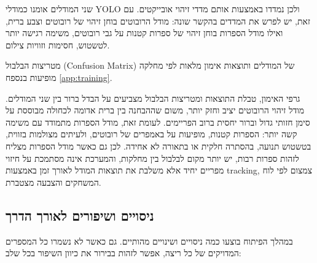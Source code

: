 שני המודלים אומנו כמודלי \textenglish{YOLO} ולכן נמדדו באמצעות אותם
מדדי זיהוי אובייקטים. עם זאת, יש לפרש את המדדים בהקשר שונה: מודל
הרובוטים בוחן זיהוי של רובוטים וצבע ברית, ואילו מודל הספרות בוחן זיהוי
של ספרות קטנות על גבי רובוטים, משימה רגישה יותר לטשטוש, חסימות וזוויות
צילום.

מטריצות הבלבול (\textenglish{Confusion Matrix}) של המודלים ותוצאות
אימון מלאות לפי מחלקה מופיעות בנספח \ref{app:training}.

גרפי האימון, טבלת התוצאות ומטריצות הבלבול מצביעים על הבדל ברור בין שני
המודלים. מודל זיהוי הרובוטים יציב וחזק יותר, משום שההבחנה בין ברית
אדומה לכחולה מבוססת על סימן חזותי גדול וברור יחסית ברוב
הפריימים. לעומת זאת, מודל הספרות מתמודד עם משימה קשה יותר: הספרות
קטנות, מופיעות על באמפרים של רובוטים, ולעיתים מצולמות בזווית, בטשטוש
תנועה, בהסתרה חלקית או בתאורה לא אחידה. לכן גם כאשר מודל הספרות מצליח
לזהות ספרות רבות, יש יותר מקום לבלבול בין מחלקות, והמערכת אינה מסתמכת
על חיזוי מפריים יחיד אלא משלבת את תוצאות המודל לאורך זמן באמצעות
\textenglish{tracking}, צמצום לפי לוח המשחקים והצבעה מצטברת.

\subsection{ניסויים ושיפורים לאורך הדרך}

במהלך הפיתוח בוצעו כמה ניסויים ושינויים מהותיים. גם כאשר לא נשמרו כל
המספרים המדויקים של כל ריצה, אפשר לזהות בבירור את כיוון השיפור בכל שלב:

